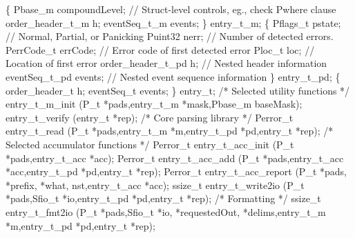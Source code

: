 \begin{code}
  \{
  Pbase\_m compoundLevel;   // Struct-level controls, eg., check Pwhere clause
  order\_header\_t\_m h;
  eventSeq\_t\_m events;
\} entry\_t\_m;
\mbox{}
  \{
  Pflags\_t pstate;         // Normal, Partial, or Panicking 
  Puint32 nerr;            // Number of detected errors.
  PerrCode\_t errCode;      // Error code of first detected error
  Ploc\_t loc;              // Location of first error
  order\_header\_t\_pd h;     // Nested header information
  eventSeq\_t\_pd events;    // Nested event sequence information
\} entry\_t\_pd;
\mbox{}
  \{
  order\_header\_t h;
  eventSeq\_t events;
\} entry\_t;
\mbox{}
/* Selected utility functions */
 entry\_t\_m\_init (P\_t *pads,entry\_t\_m *mask,Pbase\_m baseMask);
 entry\_t\_verify (entry\_t *rep);
/* Core parsing library */
Perror\_t entry\_t\_read (P\_t *pads,entry\_t\_m *m,entry\_t\_pd *pd,entry\_t *rep);
/* Selected accumulator functions */
Perror\_t entry\_t\_acc\_init (P\_t *pads,entry\_t\_acc *acc);
Perror\_t entry\_t\_acc\_add (P\_t *pads,entry\_t\_acc *acc,entry\_t\_pd *pd,entry\_t *rep);
Perror\_t entry\_t\_acc\_report (P\_t *pads,  *prefix,  *what,
                              nst,entry\_t\_acc *acc);
ssize\_t entry\_t\_write2io (P\_t *pads,Sfio\_t *io,entry\_t\_pd *pd,entry\_t *rep);
/* Formatting */
ssize\_t entry\_t\_fmt2io (P\_t *pads,Sfio\_t *io, *requestedOut,
                          *delims,entry\_t\_m *m,entry\_t\_pd *pd,entry\_t *rep);
\end{code}
